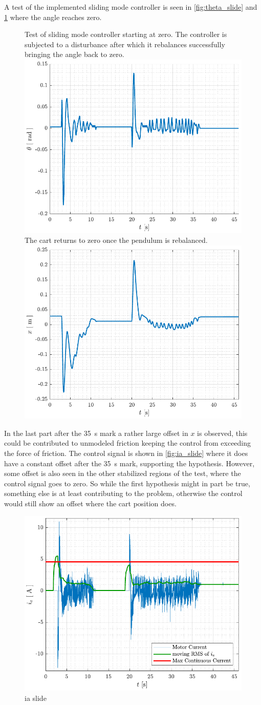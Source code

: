 %
A test of the implemented sliding mode controller is seen in \autoref{fig:theta_slide} and \ref{fig:x_slide} where the angle reaches zero.
%
\begin{figure}[H]
  \hspace{1cm}
  \captionbox
  {
    Test of sliding mode controller starting at zero. The controller is subjected to a disturbance after which it rebalances successfully bringing the angle back to zero.
    \label{fig:theta_slide}
  }
  {
    \hspace{-1cm}
    \includegraphics[width=.4\textwidth]{figures/theta_slide}
  }
  \hspace{20pt}
  \captionbox 
  {
    The cart returns to zero once the pendulum is rebalanced.
    \label{fig:x_slide}
  }
  {
    \hspace{-1cm}
    \includegraphics[width=.4\textwidth]{figures/x_slide}
  }  
\end{figure}
In the last part after the \SI{35}{s} mark a rather large offset in $x$ is observed, this could be contributed to unmodeled friction keeping the control from exceeding the force of friction. The control signal is shown in \autoref{fig:ia_slide} where it does have a constant offset after the \SI{35}{s} mark, supporting the hypothesis. However, some offset is also seen in the other stabilized regions of the test, where the control signal goes to zero. So while the first hypothesis might in part be true, something else is at least contributing to the problem, otherwise the control would still show an offset where the cart position does.
%
\begin{figure}[H]
  \includegraphics[width=.42\textwidth]{figures/ia_slide}
  \caption{ ia slide  }
  \label{fig:ia_slide}
\end{figure}

